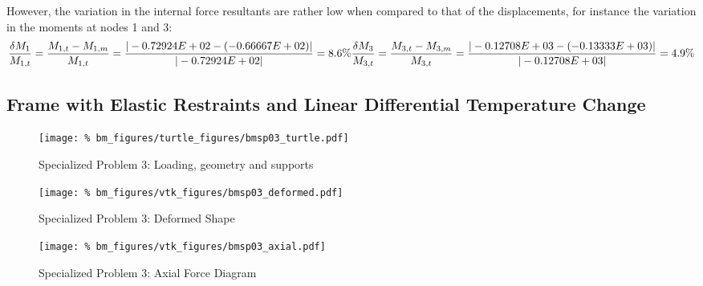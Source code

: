 \par
However, the variation in the internal force resultants are rather low when compared to that of the
displacements, for instance the variation in the moments at nodes 1 and 3:
\begin{equation*}
    \dfrac{\delta M_1}{M_{1,t}} = \dfrac{M_{1,t} - M_{1,m}}{M_{1,t}} = %
        \dfrac{|-0.72924E+02 - (-0.66667E+02)|}{|-0.72924E+02|} = 8.6\% \\
    \dfrac{\delta M_3}{M_{3,t}} = \dfrac{M_{3,t} - M_{3,m}}{M_{3,t}} = %
        \dfrac{|-0.12708E+03 - (-0.13333E+03)|}{|-0.12708E+03|} = 4.9\% \\
\end{equation*}

%
%

%
%
\subsection{Frame with Elastic Restraints and Linear Differential Temperature Change}
\begin{figure}[h]
    \texttt{[image: \%
                            bm\_figures/turtle\_figures/bmsp03\_turtle.pdf]}
    \centering
    \caption{Specialized Problem 3: Loading, geometry and supports}
    \label{fig:bmsp01_turtle}
\end{figure}


\begin{figure}[!htb]
    \texttt{[image: \%
                     bm\_figures/vtk\_figures/bmsp03\_deformed.pdf]}
    \centering
    \caption{Specialized Problem 3: Deformed Shape}
    \label{fig:bmsp03_deformed}
\end{figure}
\begin{figure}[!htb]
    \texttt{[image: \%
                     bm\_figures/vtk\_figures/bmsp03\_axial.pdf]}
    \centering
    \caption{Specialized Problem 3: Axial Force Diagram}
    \label{fig:bmsp03_shear}
\end{figure}

